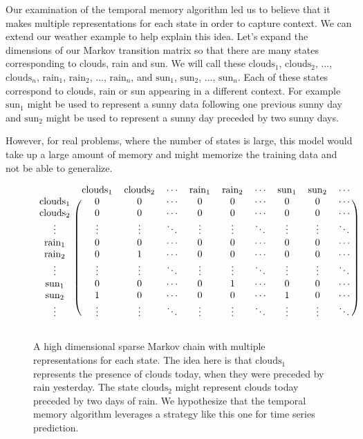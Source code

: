 \documentclass{article}
\begin{document}
Our examination of the temporal memory algorithm led us to believe that it makes  multiple representations for each state in order to capture context. We can extend our weather example to help explain this idea. Let's expand the dimensions of our Markov transition matrix so that there are many states corresponding to clouds, rain and sun. We will call these $\text{clouds}_1$, $\text{clouds}_2$, ..., $\text{clouds}_n$, $\text{rain}_1$, $\text{rain}_2$, ..., $\text{rain}_n$, and $\text{sun}_1$, $\text{sun}_2$, ..., $\text{sun}_n$. Each of these states correspond to clouds, rain or sun appearing in a different context. For example $\text{sun}_1$ might be used to represent a sunny data following one previous sunny day and $\text{sun}_2$ might be used to represent a sunny day preceded by two sunny days.

However, for real problems, where the number of states is large, this model would take up a large amount of memory and might memorize the training data and not be able to generalize.

\begin{figure}[h]
\[
\begin{blockarray}{cccccccccc}
& \text{clouds}_1 & \text{clouds}_2 & \cdots & \text{rain}_1 & \text{rain}_2 & \cdots & \text{sun}_1 & \text{sun}_2 & \cdots \\
\begin{block}{c(ccccccccc)}
\text{clouds}_1 & 0 & 0 & \cdots & 0 & 0 & \cdots & 0 & 0 & \cdots \\
\text{clouds}_2 & 0 & 0 & \cdots & 0 & 0 & \cdots & 0 & 0 & \cdots \\
\vdots & \vdots & \vdots & \ddots & \vdots & \vdots & \ddots & \vdots & \vdots & \ddots \\
\text{rain}_1 & 0 & 0 & \cdots & 0 & 0 & \cdots & 0 & 0 & \cdots \\
\text{rain}_2 & 0 & 1 & \cdots & 0 & 0 & \cdots & 0 & 0 & \cdots \\
\vdots & \vdots & \vdots & \ddots & \vdots & \vdots & \ddots & \vdots & \vdots & \ddots \\
\text{sun}_1 & 0 & 0 & \cdots & 0 & 1 & \cdots & 0 & 0 & \cdots \\
\text{sun}_2 & 1 & 0 & \cdots & 0 & 0 & \cdots & 1 & 0 & \cdots \\
\vdots & \vdots & \vdots & \ddots & \vdots & \vdots & \ddots & \vdots & \vdots & \ddots \\
\end{block}
\end{blockarray}
\]
\caption{A high dimensional sparse Markov chain with multiple representations for each state. The idea here is that $\text{clouds}_1$ represents the presence of clouds today, when they were preceded by rain yesterday. The state $\text{clouds}_2$ might represent clouds today preceded by two days of rain. We hypothesize that the temporal memory algorithm leverages a strategy like this one for time series prediction.
}
\end{figure}
\end{document}
